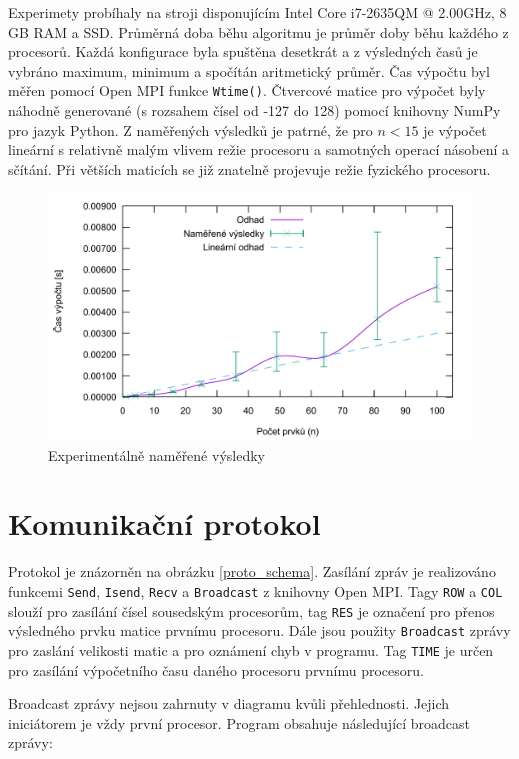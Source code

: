 \documentclass[11pt,a4paper]{article}
\begin{document}
Experimety probíhaly na stroji disponujícím Intel Core i7-2635QM @ 2.00GHz, 8 GB RAM a SSD. Průměrná doba běhu algoritmu je průměr doby běhu každého z procesorů. Každá konfigurace byla spuštěna desetkrát a z výsledných časů je vybráno maximum, minimum a spočítán aritmetický průměr. Čas výpočtu byl měřen pomocí Open MPI funkce \texttt{Wtime()}. Čtvercové matice pro výpočet byly náhodně generované (s rozsahem čísel od -127 do 128) pomocí knihovny NumPy pro jazyk Python. Z naměřených výsledků je patrné, že pro $n < 15$ je výpočet lineární s relativně malým vlivem režie procesoru a samotných operací násobení a sčítání. Při větších maticích se již znatelně projevuje režie fyzického procesoru.

\begin{figure}[!ht]
    \centering
		\includegraphics[width=1\textwidth]{results}
    \caption{Experimentálně naměřené výsledky}
\end{figure}

\section{Komunikační protokol}
\label{proto}

Protokol je znázorněn na obrázku \ref{proto_schema}. Zasílání zpráv je realizováno funkcemi \texttt{Send}, \texttt{Isend}, \texttt{Recv} a \texttt{Broadcast} z knihovny Open MPI. Tagy \texttt{ROW} a \texttt{COL} slouží pro zasílání čísel sousedským procesorům, tag \texttt{RES} je označení pro přenos výsledného prvku matice prvnímu procesoru. Dále jsou použity \texttt{Broadcast} zprávy pro zaslání velikosti matic a pro oznámení chyb v programu. Tag \texttt{TIME} je určen pro zasílání výpočetního času daného procesoru prvnímu procesoru.

Broadcast zprávy nejsou zahrnuty v diagramu kvůli přehlednosti. Jejich iniciátorem je vždy první procesor. Program obsahuje následující broadcast zprávy:
\end{document}
